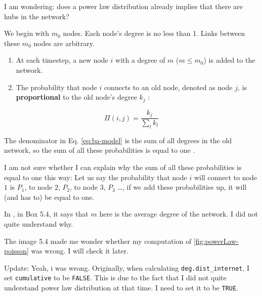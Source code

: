 \documentclass[
]{krantz}
\makeatletter
\newenvironment{kframe}{%
\medskip{}
\setlength{\fboxsep}{.8em}
 \def\at@end@of@kframe{}%
 \ifinner\ifhmode%
  \def\at@end@of@kframe{\end{minipage}}%
  \begin{minipage}{\columnwidth}%
 \fi\fi%
 \def\FrameCommand##1{\hskip\@totalleftmargin \hskip-\fboxsep
 \colorbox{shadecolor}{##1}\hskip-\fboxsep
     \hskip-\linewidth \hskip-\@totalleftmargin \hskip\columnwidth}%
 \MakeFramed {\advance\hsize-\width
   \@totalleftmargin\z@ \linewidth\hsize
   \@setminipage}}%
 {\par\unskip\endMakeFramed%
 \at@end@of@kframe}
\newenvironment{rmdblock}[1]
  {
  \begin{itemize}
  \renewcommand{\labelitemi}{
    \raisebox{-.7\height}[0pt][0pt]{
      {\setkeys{Gin}{width=3em,keepaspectratio}\texttt{[image: images/\#1]}}
    }
  }
  \setlength{\fboxsep}{1em}
  \begin{kframe}
  \item
  }
  {
  \end{kframe}
  \end{itemize}
  }
\newenvironment{rmdtip}
  {\begin{rmdblock}{tip}}
  {\end{rmdblock}}
\newenvironment{rmdreminder}
  {\begin{rmdblock}{reminder}}
  {\end{rmdblock}}
\makeatother
\begin{document}
\begin{rmdreminder}
I am wondering: does a power law distribution already implies that there are hubs in the network?
\end{rmdreminder}

We begin with \(m_0\) nodes. Each node's degree is no less than 1. Links between these \(m_0\) nodes are arbitrary.

\begin{enumerate}
\def\labelenumi{\arabic{enumi}.}
\item
  At each timestep, a new node \(i\) with a degree of \(m\) (\(m \le m_0\)) is added to the network.
\item
  The probability that node \(i\) connects to an old node, denoted as node \(j\), is \textbf{proportional} to the old node's degree \(k_j\) \citep{menczer2020first}:
\end{enumerate}

\begin{equation}
  \Pi(i, j) = \frac{k_j}{\sum\limits_l k_l} \label{eq:ba-model}
\end{equation}

The denominator in Eq. \eqref{eq:ba-model} is the sum of all degrees in the old network, so the sum of all these probabilities is equal to one \citep{menczer2020first}.

\begin{rmdtip}
I am not sure whether I can explain why the sum of all these probabilities is equal to one this way: Let us say the probability that node \(i\) will connect to node \(1\) is \(P_1\), to node \(2\), \(P_2\), to node \(3\), \(P_3\) \ldots, if we add these probabilities up, it will (and has to) be equal to one.
\end{rmdtip}

\begin{rmdreminder}
In \citet{menczer2020first}, in Box 5.4, it says that \(m\) here is the average degree of the network. I did not quite understand why.
\end{rmdreminder}

\begin{rmdreminder}
The image 5.4 made me wonder whether my computation of \ref{fig:powerLaw-poisson} was wrong. I will check it later.

Update: Yeah, i was wrong. Originally, when calculating \texttt{deg.dist\_internet}, I set \texttt{cumulative} to be \texttt{FALSE}. This is due to the fact that I did not quite understand power law distribution at that time. I need to set it to be \texttt{TRUE}.
\end{rmdreminder}
\end{document}
